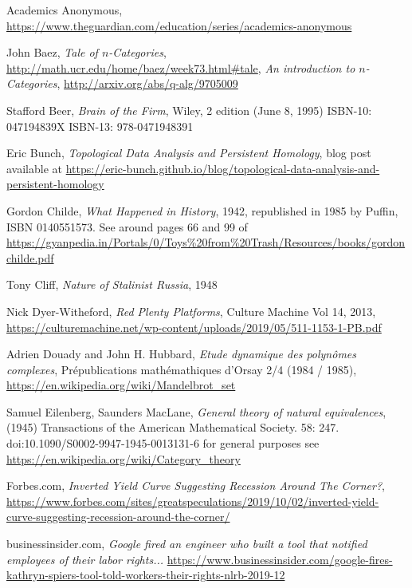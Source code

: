 \documentclass{article}
\begin{document}
\small
\begin{thebibliography}{99}

 Academics Anonymous, \url{https://www.theguardian.com/education/series/academics-anonymous}



 John Baez, \textit{Tale of $n$-Categories}, \url{http://math.ucr.edu/home/baez/week73.html#tale}, \textit{An introduction to $n$-Categories}, \url{http://arxiv.org/abs/q-alg/9705009}

 Stafford Beer, \textit{Brain of the Firm}, Wiley, 2 edition (June 8, 1995)
ISBN-10: 047194839X
ISBN-13: 978-0471948391

 Eric Bunch, \textit{Topological Data Analysis and Persistent Homology}, blog post available at \url{https://eric-bunch.github.io/blog/topological-data-analysis-and-persistent-homology}

 Gordon Childe, \textit{What Happened in History}, 1942, republished in 1985 by Puffin, ISBN 0140551573. See around pages 66 and 99 of \url{https://gyanpedia.in/Portals/0/Toys%20from%20Trash/Resources/books/gordonchilde.pdf}

 Tony Cliff, \textit{Nature of Stalinist Russia}, 1948

 Nick Dyer-Witheford, \textit{Red Plenty Platforms}, Culture Machine Vol 14, 2013, \url{https://culturemachine.net/wp-content/uploads/2019/05/511-1153-1-PB.pdf}

 Adrien Douady and John H. Hubbard, \textit{Etude dynamique des polyn\^omes complexes}, Pr\'epublications math\'emathiques d'Orsay 2/4 (1984 / 1985), \url{https://en.wikipedia.org/wiki/Mandelbrot_set}

 Samuel Eilenberg, Saunders MacLane, \textit{General theory of natural equivalences}, (1945) Transactions of the American Mathematical Society. 58: 247. doi:10.1090/S0002-9947-1945-0013131-6 for general purposes see \url{https://en.wikipedia.org/wiki/Category_theory}

 Forbes.com, \textit{Inverted Yield Curve Suggesting Recession Around The Corner?}, \url{https://www.forbes.com/sites/greatspeculations/2019/10/02/inverted-yield-curve-suggesting-recession-around-the-corner/}

 businessinsider.com, \textit{Google fired an engineer who built a tool that notified employees of their labor rights...} \url{https://www.businessinsider.com/google-fires-kathryn-spiers-tool-told-workers-their-rights-nlrb-2019-12}


\end{thebibliography}
\end{document}
